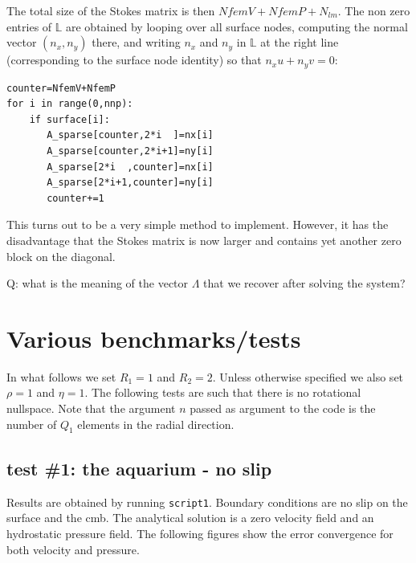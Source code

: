 The total size of the Stokes matrix is then $NfemV+NfemP+N_{lm}$.
The non zero entries of $\mathbb{L}$ are obtained by 
looping over all surface nodes, computing the normal vector $(n_x,n_y)$ there, and 
writing $n_x$ and $n_y$ in $\mathbb{L}$ at the right line (corresponding to the 
surface node identity) so that $n_x u + n_y v = 0$:
\begin{lstlisting}
counter=NfemV+NfemP
for i in range(0,nnp):
    if surface[i]:
       A_sparse[counter,2*i  ]=nx[i]
       A_sparse[counter,2*i+1]=ny[i]
       A_sparse[2*i  ,counter]=nx[i]
       A_sparse[2*i+1,counter]=ny[i]
       counter+=1
\end{lstlisting}

This turns out to be a very simple method to implement. However, it has the disadvantage that 
the Stokes matrix is now larger and contains yet another zero block on the diagonal.

Q: what is the meaning of the vector $\Lambda$ that we recover after solving the system?

\newpage
\section*{Various benchmarks/tests}

In what follows we set $R_1=1$ and $R_2=2$. Unless otherwise specified we also set $\rho=1$
and $\eta=1$. The following tests are such that there is no rotational nullspace.
Note that the argument $n$ passed as argument to the code is the number of $Q_1$ 
elements in the radial direction.

\subsection*{test \#1: the aquarium - no slip}

Results are obtained by running {\tt script1}. Boundary conditions are 
no slip on the surface and the cmb. 
The analytical solution is a zero velocity field and an hydrostatic pressure field.
The following figures show the error convergence for both velocity and pressure.

